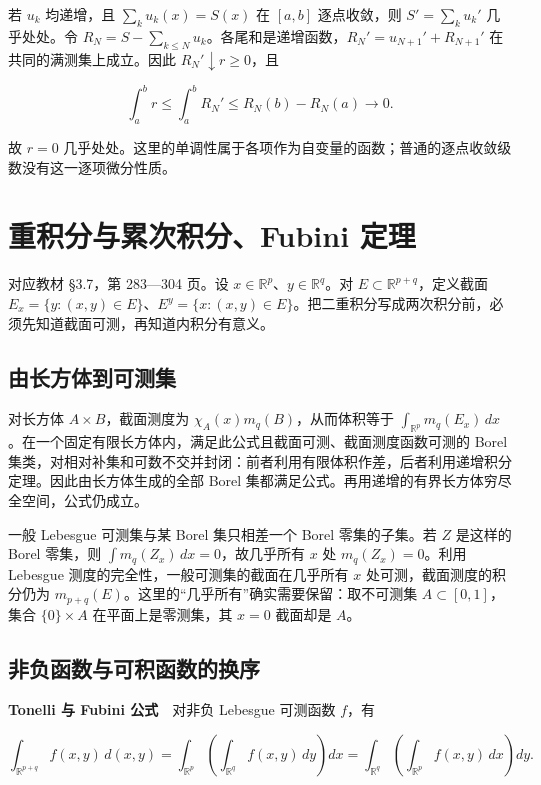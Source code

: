 \documentclass[11pt,a4paper]{article}
\begin{document}
若 \(u_k\) 均递增，且 \(\sum_k u_k(x)=S(x)\) 在 \([a,b]\) 逐点收敛，则 \(S'=\sum_k u_k'\) 几乎处处。令 \(R_N=S-\sum_{k\le N}u_k\)。各尾和是递增函数，\(R_N'=u_{N+1}'+R_{N+1}'\) 在共同的满测集上成立。因此 \(R_N'\downarrow r\ge0\)，且

\[
\int_a^b r\le\int_a^b R_N'\le R_N(b)-R_N(a)\longrightarrow0.
\]

故 \(r=0\) 几乎处处。这里的单调性属于各项作为自变量的函数；普通的逐点收敛级数没有这一逐项微分性质。

\section{重积分与累次积分、Fubini 定理}
对应教材 §3.7，第 283---304 页。设 \(x\in\mathbb R^p\)、\(y\in\mathbb R^q\)。对 \(E\subset\mathbb R^{p+q}\)，定义截面 \(E_x=\{y:(x,y)\in E\}\)、\(E^y=\{x:(x,y)\in E\}\)。把二重积分写成两次积分前，必须先知道截面可测，再知道内积分有意义。

\subsection*{由长方体到可测集}\label{ux7531ux957fux65b9ux4f53ux5230ux53efux6d4bux96c6}

对长方体 \(A\times B\)，截面测度为 \(\chi_A(x)m_q(B)\)，从而体积等于 \(\int_{\mathbb R^p}m_q(E_x)\,dx\)。在一个固定有限长方体内，满足此公式且截面可测、截面测度函数可测的 Borel 集类，对相对补集和可数不交并封闭：前者利用有限体积作差，后者利用递增积分定理。因此由长方体生成的全部 Borel 集都满足公式。再用递增的有界长方体穷尽全空间，公式仍成立。

一般 Lebesgue 可测集与某 Borel 集只相差一个 Borel 零集的子集。若 \(Z\) 是这样的 Borel 零集，则 \(\int m_q(Z_x)\,dx=0\)，故几乎所有 \(x\) 处 \(m_q(Z_x)=0\)。利用 Lebesgue 测度的完全性，一般可测集的截面在几乎所有 \(x\) 处可测，截面测度的积分仍为 \(m_{p+q}(E)\)。这里的``几乎所有''确实需要保留：取不可测集 \(A\subset[0,1]\)，集合 \(\{0\}\times A\) 在平面上是零测集，其 \(x=0\) 截面却是 \(A\)。

\subsection*{非负函数与可积函数的换序}\label{ux975eux8d1fux51fdux6570ux4e0eux53efux79efux51fdux6570ux7684ux6362ux5e8f}

\textbf{Tonelli 与 Fubini 公式}　对非负 Lebesgue 可测函数 \(f\)，有

\[
\int_{\mathbb R^{p+q}} f(x,y)\,d(x,y)
=\int_{\mathbb R^p}\!\left(\int_{\mathbb R^q}f(x,y)\,dy\right)dx
=\int_{\mathbb R^q}\!\left(\int_{\mathbb R^p}f(x,y)\,dx\right)dy.
\]
\end{document}
